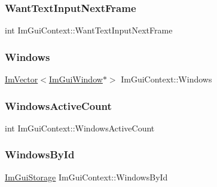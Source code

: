 \hypertarget{struct_im_gui_context_abe551d35ea5c1aa61a4d5c785c8e0d9d}{}\label{struct_im_gui_context_abe551d35ea5c1aa61a4d5c785c8e0d9d} 
\subsubsection{\texorpdfstring{Want\+Text\+Input\+Next\+Frame}{WantTextInputNextFrame}}
{\footnotesize\ttfamily int Im\+Gui\+Context\+::\+Want\+Text\+Input\+Next\+Frame}

\hypertarget{struct_im_gui_context_a0f59a9a861d097be066c6cc106e40f3e}{}\label{struct_im_gui_context_a0f59a9a861d097be066c6cc106e40f3e} 
\subsubsection{\texorpdfstring{Windows}{Windows}}
{\footnotesize\ttfamily \hyperlink{class_im_vector}{Im\+Vector}$<$\hyperlink{struct_im_gui_window}{Im\+Gui\+Window}$\ast$$>$ Im\+Gui\+Context\+::\+Windows}

\hypertarget{struct_im_gui_context_a95237c5f9eb869da0f1947c54a521489}{}\label{struct_im_gui_context_a95237c5f9eb869da0f1947c54a521489} 
\subsubsection{\texorpdfstring{Windows\+Active\+Count}{WindowsActiveCount}}
{\footnotesize\ttfamily int Im\+Gui\+Context\+::\+Windows\+Active\+Count}

\hypertarget{struct_im_gui_context_adc1e46e1c1582a0f0eb74d957efedf98}{}\label{struct_im_gui_context_adc1e46e1c1582a0f0eb74d957efedf98} 
\subsubsection{\texorpdfstring{Windows\+By\+Id}{WindowsById}}
{\footnotesize\ttfamily \hyperlink{struct_im_gui_storage}{Im\+Gui\+Storage} Im\+Gui\+Context\+::\+Windows\+By\+Id}

